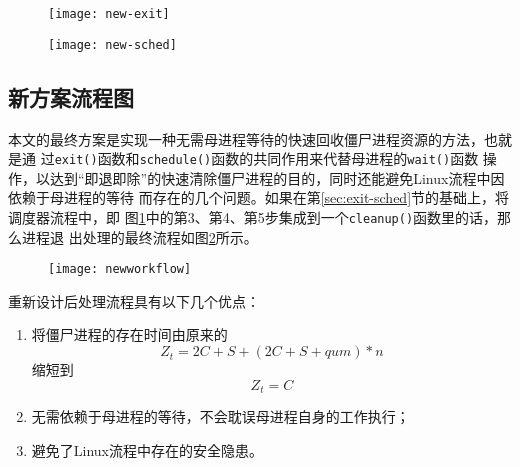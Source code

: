 \documentclass{swfuthesism}
\begin{document}
\begin{figure}
  \centering
  \begin{minipage}{.3\linewidth}
    \texttt{[image: new-exit]}
    \label{fig:new_exit}
  \end{minipage}\qquad
  \begin{minipage}{.3\linewidth}
    \texttt{[image: new-sched]}
    \label{fig:new_sched}
  \end{minipage}
\end{figure}

\subsection{新方案流程图}

本文的最终方案是实现一种无需母进程等待的快速回收僵尸进程资源的方法，也就是通
过\texttt{exit()}函数和\texttt{schedule()}函数的共同作用来代替母进程的\texttt{wait()}函数
操作，以达到“即退即除”的快速清除僵尸进程的目的，同时还能避免Linux流程中因依赖于母进程的等待
而存在的几个问题。如果在第\ref{sec:exit-sched}节的基础上，将调度器流程中，即
图\ref{fig:new_sched}中的第3、第4、第5步集成到一个\texttt{cleanup()}函数里的话，那么进程退
出处理的最终流程如图\ref{fig:new_workflow}所示。

\begin{figure}
  \centering
  \texttt{[image: newworkflow]}
  \label{fig:new_workflow}
\end{figure}

重新设计后处理流程具有以下几个优点：

\begin{enumerate}
\item 将僵尸进程的存在时间由原来的
  \begin{equation}
    \label{eq:22}
    Z_t=2C+S+(2C+S+qum)*n
  \end{equation}
  缩短到
  \begin{equation}
    \label{eq:3}
    Z_t=C
  \end{equation}
\item 无需依赖于母进程的等待，不会耽误母进程自身的工作执行；
\item 避免了Linux流程中存在的安全隐患。
\end{enumerate}
\end{document}
